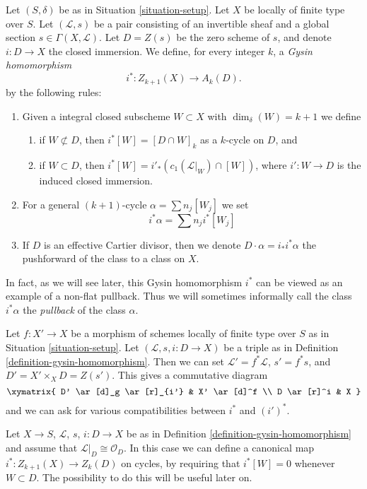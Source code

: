 \begin{definition}
\label{definition-gysin-homomorphism}
Let $(S, \delta)$ be as in Situation \ref{situation-setup}.
Let $X$ be locally of finite type over $S$.
Let $(\mathcal{L}, s)$ be a pair consisting of an invertible
sheaf and a global section $s \in \Gamma(X, \mathcal{L})$.
Let $D = Z(s)$ be the zero scheme of $s$, and
denote $i : D \to X$ the closed immersion.
We define, for every integer $k$, a
{\it Gysin homomorphism}
$$
i^* : Z_{k + 1}(X) \to A_k(D).
$$
by the following rules:
\begin{enumerate}
\item Given a integral closed subscheme $W \subset X$ with
$\dim_\delta(W) = k + 1$ we define
\begin{enumerate}
\item if $W \not \subset D$, then $i^*[W] = [D \cap W]_k$ as a
$k$-cycle on $D$, and
\item if $W \subset D$, then
$i^*[W] = i'_*(c_1(\mathcal{L}|_W) \cap [W])$,
where $i' : W \to D$ is the induced closed immersion.
\end{enumerate}
\item For a general $(k + 1)$-cycle $\alpha = \sum n_j[W_j]$
we set
$$
i^*\alpha = \sum n_j i^*[W_j]
$$
\item If $D$ is an effective Cartier divisor, then we denote
$D \cdot \alpha = i_*i^*\alpha$ the pushforward of
the class to a class on $X$.
\end{enumerate}
\end{definition}

\noindent
In fact, as we will see later, this Gysin homomorphism $i^*$ can be viewed
as an example of a non-flat pullback. Thus we will sometimes informally
call the class $i^*\alpha$ the {\it pullback} of the class $\alpha$.

\begin{remark}
\label{remark-pullback-pairs}
Let $f : X' \to X$ be a morphism of schemes locally of finite type over $S$
as in Situation \ref{situation-setup}. Let $(\mathcal{L}, s, i : D \to X)$
be a triple as in Definition \ref{definition-gysin-homomorphism}.
Then we can set $\mathcal{L}' = f^*\mathcal{L}$, $s' = f^*s$, and
$D' = X' \times_X D = Z(s')$. This gives a commutative diagram
$$
\xymatrix{
D' \ar[d]_g \ar[r]_{i'} & X' \ar[d]^f \\
D \ar[r]^i & X
}
$$
and we can ask for various compatibilities between $i^*$ and $(i')^*$.
\end{remark}

\begin{remark}
\label{remark-on-cycles}
Let $X \to S$, $\mathcal{L}$, $s$, $i : D \to X$ be as in
Definition \ref{definition-gysin-homomorphism} and assume
that $\mathcal{L}|_D \cong \mathcal{O}_D$. In this case we
can define a canonical map $i^* : Z_{k + 1}(X) \to Z_k(D)$
on cycles, by requiring that $i^*[W] = 0$ whenever $W \subset D$.
The possibility to do this will be useful later on.
\end{remark}

